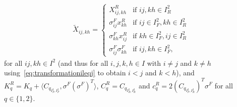 \documentclass[10pt,a4paper]{amsart}
\begin{document}
\begin{proposition}
\begin{align} \label{eq:fixingImplications}
\widetilde{X}_{ij,kh} = 
    \begin{cases}
        X^R_{ij,kh} & \text{if } ij,kh \in I^2_R \\
        \sigma^F_{ij}x^R_{kh} & \text{if } ij \in I^2_F, kh \in I^2_R\\        
        \sigma^F_{kh}x^R_{ij} & \text{if } kh \in I^2_F, ij \in I^2_R\\
        \sigma^F_{ij}\sigma^F_{kh} & \text{if } ij,kh \in I^2_F,
    \end{cases}
\end{align}
for all $ij, kh \in I^2$ (and thus for all $i,j,k,h \in I$ with $i\neq j$ and $k \neq h$ using~\eqref{eq:transformationileqj} to obtain $i<j$ and $k<h$), 
and $K_q^R = K_q + \langle C_{q_{I^2_F, I^2_F}}, \sigma^F(\sigma^F)^T \rangle$, $C_q^R = C_{q_{I^2_R, I^2_R}}$ and $c_q^R = 2(C_{q_{I^2_F,I^2_R}})^T \sigma^F$ for all $q\in \{1,2\}$. 
\end{proposition}
\end{document}
